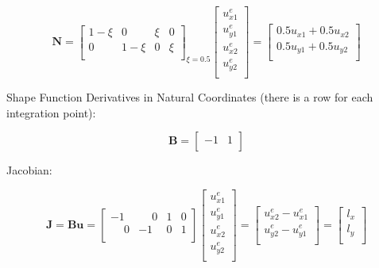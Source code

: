 \documentclass[10pt,b5paper,titlepage]{book}
\newcommand{\m}{\mathbf}
\begin{document}
\begin{equation}
    \m{N} = \begin{bmatrix}
        1 - \xi & 0 & \xi & 0 \\
        0 & 1 - \xi & 0 & \xi \\
    \end{bmatrix}_{\xi = 0.5}
    \begin{bmatrix}
        u_{x1}^e \\
        u_{y1}^e \\
        u_{x2}^e \\
        u_{y2}^e \\
    \end{bmatrix}
    = \begin{bmatrix}
        0.5 u_{x1} + 0.5 u_{x2} \\
        0.5 u_{y1} + 0.5 u_{y2} \\
    \end{bmatrix}
\end{equation}

Shape Function Derivatives in Natural Coordinates (there is a row for each
integration point):

\begin{equation}
    \m{B} = \begin{bmatrix}
        -1 & 1 \\
    \end{bmatrix}
\end{equation}

Jacobian:

\begin{equation}
    \m{J} = \m{B} \m{u} = \begin{bmatrix}
        -1 & \phantom{-}0 & 1 & 0 \\
        \phantom{-}0 & -1 & 0 & 1  \\
    \end{bmatrix}
    \begin{bmatrix}
        u_{x1}^e \\
        u_{y1}^e \\
        u_{x2}^e \\
        u_{y2}^e \\
    \end{bmatrix}
    = \begin{bmatrix}
        u_{x2}^e - u_{x1}^e \\
        u_{y2}^e - u_{y1}^e \\
    \end{bmatrix}
    = \begin{bmatrix}
        l_x \\
        l_y \\
    \end{bmatrix}
\end{equation}
\end{document}

